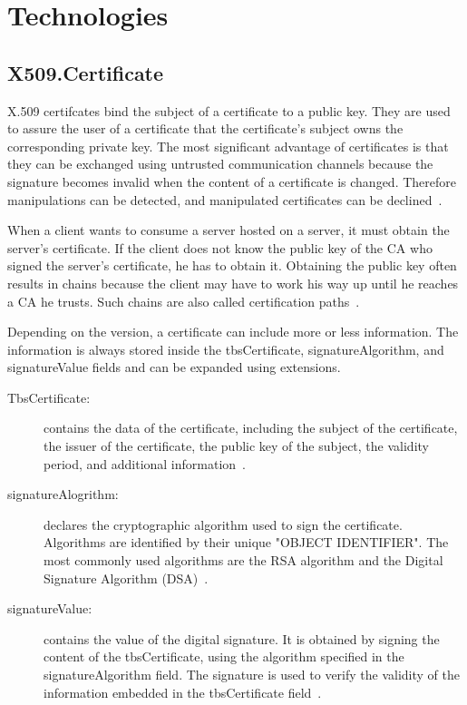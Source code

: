 
\section{Technologies}
\subsection{X509.Certificate}
X.509 certifcates bind the subject of a certificate to a public key.
They are used to assure the user of a certificate that the certificate's subject owns the corresponding private key.
The most significant advantage of certificates is that they can be exchanged using untrusted communication channels because the signature becomes invalid when the content of a certificate is changed.
Therefore manipulations can be detected, and manipulated certificates can be declined~\cite{x509rfc}.

When a client wants to consume a server hosted on a server, it must obtain the server's certificate.
If the client does not know the public key of the CA who signed the server's certificate, he has to obtain it.
Obtaining the public key often results in chains because the client may have to work his way up until he reaches a CA he trusts.
Such chains are also called certification paths~\cite{x509rfc}.

Depending on the version, a certificate can include more or less information.
The information is always stored inside the tbsCertificate, signatureAlgorithm, and signatureValue fields and can be expanded using extensions.
\begin{description}
	\item[TbsCertificate:] contains the data of the certificate, including the subject of the certificate, the issuer of the certificate, the public key of the subject, the validity period, and additional information~\cite{x509rfc}.
	\item[signatureAlogrithm:] declares the cryptographic algorithm used to sign the certificate.
		Algorithms are identified by their unique "OBJECT IDENTIFIER".
		The most commonly used algorithms are the RSA algorithm and the Digital Signature Algorithm (DSA)~\cite{x509rfc}.
	\item[signatureValue:] contains the value of the digital signature.
		It is obtained by signing the content of the tbsCertificate, using the algorithm specified in the signatureAlgorithm field.
		The signature is used to verify the validity of the information embedded in the tbsCertificate field~\cite{x509rfc}.
\end{description}


